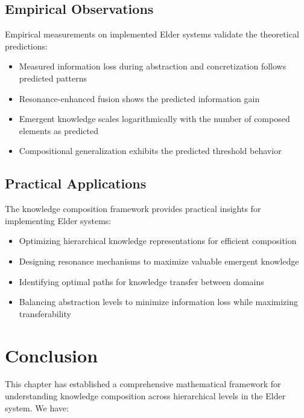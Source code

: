 \subsection{Empirical Observations}

Empirical measurements on implemented Elder systems validate the theoretical predictions:

\begin{itemize}
    \item Measured information loss during abstraction and concretization follows predicted patterns
    \item Resonance-enhanced fusion shows the predicted information gain
    \item Emergent knowledge scales logarithmically with the number of composed elements as predicted
    \item Compositional generalization exhibits the predicted threshold behavior
\end{itemize}

\subsection{Practical Applications}

The knowledge composition framework provides practical insights for implementing Elder systems:

\begin{itemize}
    \item Optimizing hierarchical knowledge representations for efficient composition
    \item Designing resonance mechanisms to maximize valuable emergent knowledge
    \item Identifying optimal paths for knowledge transfer between domains
    \item Balancing abstraction levels to minimize information loss while maximizing transferability
\end{itemize}

\section{Conclusion}

This chapter has established a comprehensive mathematical framework for understanding knowledge composition across hierarchical levels in the Elder system. We have:

